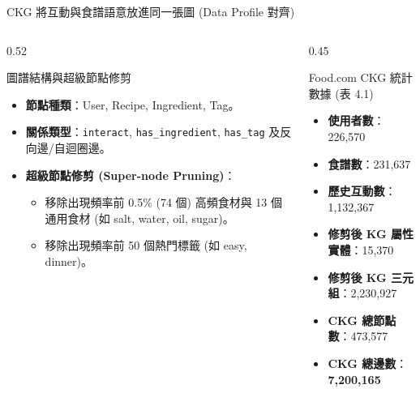 \documentclass[aspectratio=169, 10pt]{beamer}
\begin{document}
\begin{frame}{CKG 將互動與食譜語意放進同一張圖 (Data Profile 對齊)}
  \begin{columns}[T]
    \begin{column}{0.52\textwidth}
      \begin{block}{圖譜結構與超級節點修剪}
        \begin{itemize}
          \item \textbf{節點種類}：User, Recipe, Ingredient, Tag。
          \item \textbf{關係類型}：\texttt{interact}, \texttt{has\_ingredient}, \texttt{has\_tag} 及反向邊/自迴圈邊。
          \item \textbf{超級節點修剪 (Super-node Pruning)}：
            \begin{itemize}
              \item 移除出現頻率前 0.5\% (74 個) 高頻食材與 13 個通用食材 (如 salt, water, oil, sugar)。
              \item 移除出現頻率前 50 個熱門標籤 (如 easy, dinner)。
            \end{itemize}
        \end{itemize}
      \end{block}
    \end{column}
    
    \begin{column}{0.45\textwidth}
      \begin{block}{Food.com CKG 統計數據 (表 4.1)}
        \small
        \begin{itemize}
          \item \textbf{使用者數}：226,570
          \item \textbf{食譜數}：231,637
          \item \textbf{歷史互動數}：1,132,367
          \item \textbf{修剪後 KG 屬性實體}：15,370
          \item \textbf{修剪後 KG 三元組}：2,230,927
          \item \textbf{CKG 總節點數}：473,577
          \item \textbf{CKG 總邊數}：\textbf{7,200,165}
        \end{itemize}
      \end{block}
    \end{column}
  \end{columns}
\end{frame}
\end{document}
